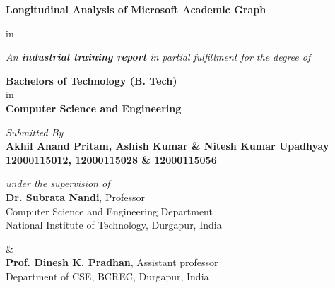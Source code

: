 \begin{titlepage}
\begin{center}
\vspace{1 in}
\begin{LARGE}\textbf{Longitudinal Analysis of Microsoft Academic Graph}
\end{LARGE}
 in

\emph{An \textbf{industrial training report} in partial fulfillment for the degree of}\\
\begin{large}
\textbf{Bachelors of Technology (B. Tech)}\\
in \\
\textbf{Computer Science and Engineering}\\
\end{large}


\vskip 0.15in

\begin{large}
\emph{Submitted By}\\
\textbf{Akhil Anand Pritam, Ashish Kumar \& Nitesh Kumar Upadhyay  \vskip 0.01in 12000115012, 12000115028 \& 12000115056}\\
\end{large}


\vskip 0.15in

\begin{large}

\emph{under the supervision of}\\
\textbf{Dr. Subrata Nandi}, Professor\\
Computer Science and Engineering Department\\
National Institute of Technology, Durgapur,
India

\& \\

\textbf{Prof. Dinesh K. Pradhan}, Assistant professor \\
Department of CSE, BCREC, Durgapur, India\\

\end{large}


\end{center}
\end{titlepage}
